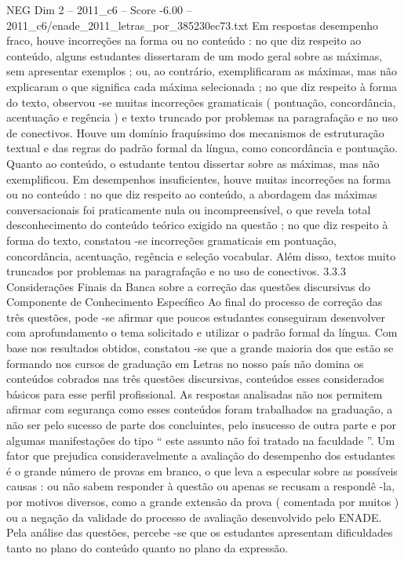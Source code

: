 \begin{textsample}{NEG Dim 2 – 2011\_c6 – Score -6.00 – 2011\_c6/enade\_2011\_letras\_por\_385230ec73.txt}
Em respostas desempenho fraco, houve incorreções na forma ou no conteúdo : no que diz respeito ao conteúdo, alguns estudantes dissertaram de um modo geral sobre as máximas, sem apresentar exemplos ; ou, ao contrário, exemplificaram as máximas, mas não explicaram o que significa cada máxima selecionada ; no que diz respeito à forma do texto, observou -se muitas incorreções gramaticais ( pontuação, concordância, acentuação e regência ) e texto truncado por problemas na paragrafação e no uso de conectivos.
Houve um domínio fraquíssimo dos mecanismos de estruturação textual e das regras do padrão formal da língua, como concordância e pontuação.
Quanto ao conteúdo, o estudante tentou dissertar sobre as máximas, mas não exemplificou.
Em desempenhos insuficientes, houve muitas incorreções na forma ou no conteúdo : no que diz respeito ao conteúdo, a abordagem das máximas conversacionais foi praticamente nula ou incompreensível, o que revela total desconhecimento do conteúdo teórico exigido na questão ; no que diz respeito à forma do texto, constatou -se incorreções gramaticais em pontuação, concordância, acentuação, regência e seleção vocabular.
Além disso, textos muito truncados por problemas na paragrafação e no uso de conectivos. 3.3.3 Considerações Finais da Banca sobre a correção das questões discursivas do Componente de Conhecimento Específico Ao final do processo de correção das três questões, pode -se afirmar que poucos estudantes conseguiram desenvolver com aprofundamento o tema solicitado e utilizar o padrão formal da língua.
Com base nos resultados obtidos, constatou -se que a grande maioria dos que estão se formando nos cursos de graduação em Letras no nosso país não domina os conteúdos cobrados nas três questões discursivas, conteúdos esses considerados básicos para esse perfil profissional.
As respostas analisadas não nos permitem afirmar com segurança como esses conteúdos foram trabalhados na graduação, a não ser pelo sucesso de parte dos concluintes, pelo insucesso de outra parte e por algumas manifestações do tipo “ este assunto não foi tratado na faculdade ”.
Um fator que prejudica consideravelmente a avaliação do desempenho dos estudantes é o grande número de provas em branco, o que leva a especular sobre as possíveis causas : ou não sabem responder à questão ou apenas se recusam a respondê -la, por motivos diversos, como a grande extensão da prova ( comentada por muitos ) ou a negação da validade do processo de avaliação desenvolvido pelo ENADE.
Pela análise das questões, percebe -se que os estudantes apresentam dificuldades tanto no plano do conteúdo quanto no plano da expressão.

\end{textsample}
